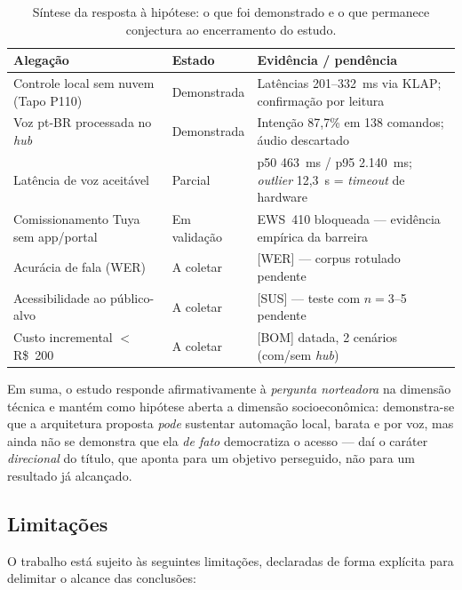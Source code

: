 \begin{table}[H]
\centering
\caption{Síntese da resposta à hipótese: o que foi demonstrado e o que permanece
conjectura ao encerramento do estudo.}
\label{tab:sintese-hipotese}
\small
\begin{tabular}{@{}p{3.8cm}p{2.3cm}p{8.2cm}@{}}
\toprule
\textbf{Alegação} & \textbf{Estado} & \textbf{Evidência / pendência} \\
\midrule
Controle local sem nuvem (Tapo P110) & Demonstrada & Latências 201--332~ms via KLAP;
confirmação por leitura \\
Voz pt-BR processada no \textit{hub} & Demonstrada & Intenção 87,7\% em 138 comandos;
áudio descartado \\
Latência de voz aceitável & Parcial & p50 463~ms / p95 2.140~ms; \textit{outlier} 12,3~s
= \textit{timeout} de hardware \\
Comissionamento Tuya sem app/portal & Em validação & EWS~410 bloqueada --- evidência
empírica da barreira \\
Acurácia de fala (WER) & A coletar & [WER] --- corpus rotulado pendente \\
Acessibilidade ao público-alvo & A coletar & [SUS] --- teste com $n=3$--5 pendente \\
Custo incremental $<$ R\$~200 & A coletar & [BOM] datada, 2 cenários (com/sem \textit{hub}) \\
\bottomrule
\end{tabular}
\end{table}

Em suma, o estudo responde afirmativamente à \emph{pergunta norteadora} na dimensão
técnica e mantém como hipótese aberta a dimensão socioeconômica: demonstra-se que a
arquitetura proposta \emph{pode} sustentar automação local, barata e por voz, mas ainda
não se demonstra que ela \emph{de fato} democratiza o acesso --- daí o caráter
\emph{direcional} do título, que aponta para um objetivo perseguido, não para um
resultado já alcançado.

\subsection{Limitações}\label{sec:limitacoes}

O trabalho está sujeito às seguintes limitações, declaradas de forma explícita para
delimitar o alcance das conclusões:

